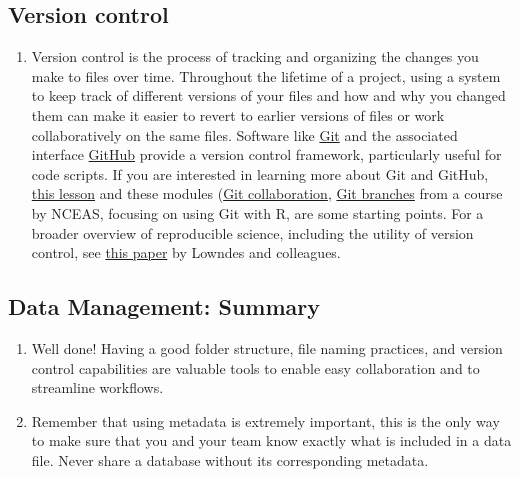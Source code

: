 \documentclass[
]{book}
\providecommand{\tightlist}{%
  \setlength{\itemsep}{0pt}\setlength{\parskip}{0pt}}
\begin{document}
\hypertarget{version-control}{%
\subsection{Version control}\label{version-control}}

\begin{enumerate}
\def\labelenumi{\arabic{enumi}.}
\tightlist
\item
  Version control is the process of tracking and organizing the changes you make to files over time. Throughout the lifetime of a project, using a system to keep track of different versions of your files and how and why you changed them can make it easier to revert to earlier versions of files or work collaboratively on the same files. Software like \href{https://git-scm.com}{Git} and the associated interface \href{https://github.com}{GitHub} provide a version control framework, particularly useful for code scripts. If you are interested in learning more about Git and GitHub, \href{https://learning.nceas.ucsb.edu/2021-11-RRCourse/version-control-with-git-and-github.html}{this lesson} and these modules (\href{https://learning.nceas.ucsb.edu/2021-11-RRCourse/git-collaboration-and-conflict-management.html}{Git collaboration}, \href{https://learning.nceas.ucsb.edu/2021-11-RRCourse/git-pull-requests-and-branches.html}{Git branches} from a course by NCEAS, focusing on using Git with R, are some starting points. For a broader overview of reproducible science, including the utility of version control, see \href{https://www.nature.com/articles/s41559-017-0160}{this paper} by Lowndes and colleagues.
\end{enumerate}

\hypertarget{data-management-summary}{%
\subsection{Data Management: Summary}\label{data-management-summary}}

\begin{enumerate}
\def\labelenumi{\arabic{enumi}.}
\item
  Well done! Having a good folder structure, file naming practices, and version control capabilities are valuable tools to enable easy collaboration and to streamline workflows.
\item
  Remember that using metadata is extremely important, this is the only way to make sure that you and your team know exactly what is included in a data file. Never share a database without its corresponding metadata.
\end{enumerate}
\end{document}
